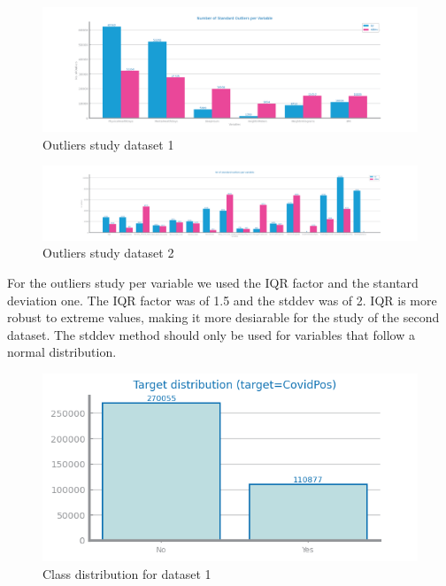 \documentclass[10pt]{extarticle}
\begin{document}
\begin{figure}[H]
\centering\includegraphics[scale=0.60]{images/dataset1/data_profiling/CovidPos_outliers_standard.png}
\caption{Outliers study dataset 1}
\end{figure}

\begin{figure}[H]
\centering\includegraphics[scale=0.40]{images/dataset2/data_profiling/Credit_Score_outliers_standard.png}
\caption{Outliers study dataset 2}
\end{figure}
For the outliers study per variable we used the IQR factor and the stantard deviation one. The IQR factor was of 1.5 and the 
stddev was of 2. %
IQR is more robust to extreme values, making it more desiarable for the study of the second dataset. The stddev method should only be
used for variables that follow a normal distribution.

\begin{figure}[H]
\centering\includegraphics[scale=0.95]{images/dataset1/data_profiling/CovidPos_class_distribution.png}
\caption{Class distribution for dataset 1}
\end{figure}
\end{document}

